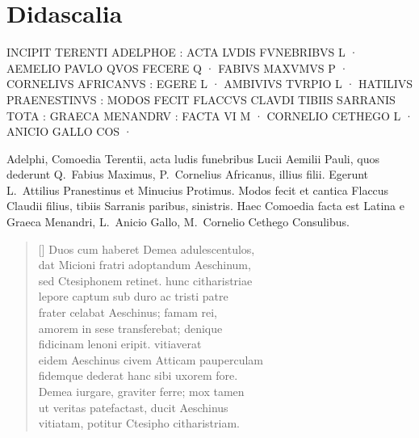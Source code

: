\section*{Didascalia}

{\large

\noindent INCIPIT TERENTI ADELPHOE : ACTA LVDIS FVNEBRIBVS L · AEMELIO PAVLO QVOS FECERE Q · FABIVS MAXVMVS P · CORNELIVS AFRICANVS : EGERE L · AMBIVIVS TVRPIO L · HATILIVS PRAENESTINVS : MODOS FECIT FLACCVS CLAVDI TIBIIS SARRANIS TOTA : GRAECA MENANDRV : FACTA VI M · CORNELIO CETHEGO L · ANICIO GALLO COS ·\\

}


\noindent Adelphi, Comoedia Terentii, acta ludis funebribus Lucii Aemilii Pauli, quos dederunt Q.\ Fabius Maximus, P.\ Cornelius Africanus, illius filii. Egerunt L.\ Attilius Pranestinus et Minucius Protimus. Modos fecit et cantica Flaccus Claudii filius, tibiis Sarranis paribus, sinistris. Haec Comoedia facta est Latina e Graeca Menandri, L.\ Anicio Gallo, M.\ Cornelio Cethego Consulibus.


\settowidth{\versewidth}{sed Ctesiphonem retinet. hunc citharistriae}
\begin{verse}[\versewidth]
{\large
    Duos cum haberet Demea adulescentulos,\\
    dat Micioni fratri adoptandum Aeschinum,\\
    sed Ctesiphonem retinet. hunc citharistriae\\
    lepore captum sub duro ac tristi patre\\
    frater celabat Aeschinus; famam rei,\\
    amorem in sese transferebat; denique\\
    fidicinam lenoni eripit. vitiaverat\\
    eidem Aeschinus civem Atticam pauperculam\\
    fidemque dederat hanc sibi uxorem fore.\\
    Demea iurgare, graviter ferre; mox tamen\\
    ut veritas patefactast, ducit Aeschinus\\
    vitiatam, potitur Ctesipho citharistriam.\\

}
\end{verse}


